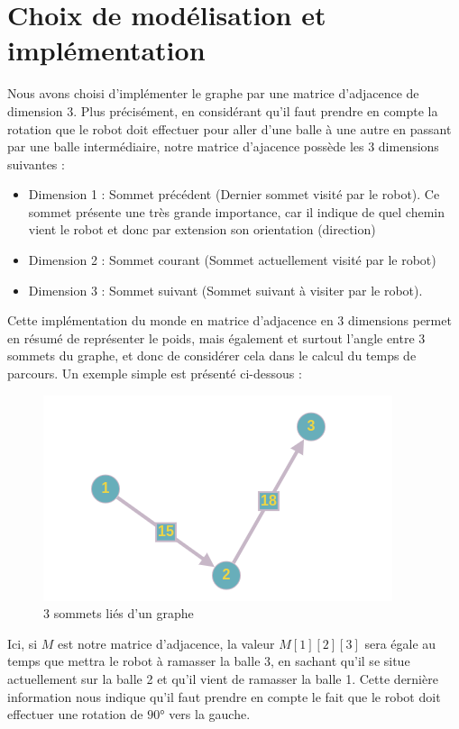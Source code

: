 \documentclass[12pt]{article}
\begin{document}
    \section{Choix de modélisation et implémentation}

    Nous avons choisi d'implémenter le graphe par une matrice d'adjacence de dimension 3. Plus précisément, en considérant qu'il faut prendre en compte la rotation que le robot doit effectuer pour aller d'une balle à une autre en passant par une balle intermédiaire, notre matrice d'ajacence possède les 3 dimensions suivantes :

    \begin{itemize}
        \item Dimension 1 : Sommet précédent (Dernier sommet visité par le robot). Ce sommet présente une très grande importance, car il indique de quel chemin vient le robot et donc par extension son orientation (direction)
        \item Dimension 2 : Sommet courant (Sommet actuellement visité par le robot)
        \item Dimension 3 : Sommet suivant (Sommet suivant à visiter par le robot).
    \end{itemize}

    Cette implémentation du monde en matrice d'adjacence en 3 dimensions permet en résumé de représenter le poids, mais également et surtout l'angle entre 3 sommets du graphe, et donc de considérer cela dans le calcul du temps de parcours. Un exemple simple est présenté ci-dessous :

    \begin{figure}[H]
        \centering
        \includegraphics[scale=0.7]{img/example_3dim}
        \caption{3 sommets liés d'un graphe}
        \label{img_3somlinked}
    \end{figure}

    Ici, si $M$ est notre matrice d'adjacence, la valeur $M[1][2][3]$ sera égale au temps que mettra le robot à ramasser la balle 3, en sachant qu'il se situe actuellement sur la balle 2 et qu'il vient de ramasser la balle 1. Cette dernière information nous indique qu'il faut prendre en compte le fait que le robot doit effectuer une rotation de $90$° vers la gauche.
\end{document}
